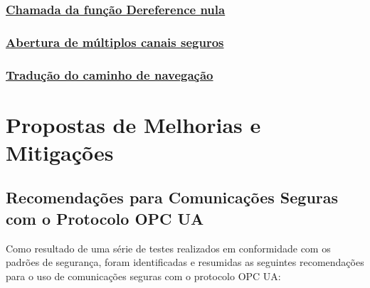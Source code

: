 \subsubsection*{\underline{Chamada da função Dereference nula}}

\subsubsection*{\underline{Abertura de múltiplos canais seguros}}

\subsubsection*{\underline{Tradução do caminho de navegação}}

\section{Propostas de Melhorias e Mitigações} \label{sec:melhorias-mitigacoes}

\subsection{Recomendações para Comunicações Seguras com o Protocolo OPC UA}

Como resultado de uma série de testes realizados em conformidade com os padrões de segurança, foram identificadas e resumidas as seguintes recomendações para o uso de comunicações seguras com o protocolo OPC UA:

